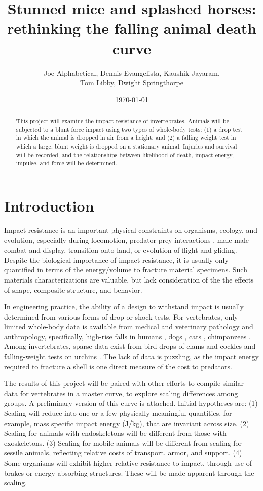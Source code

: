 \documentclass{article}
\title{Stunned mice and splashed horses:  rethinking the falling animal death curve}
\author{Joe Alphabetical, Dennis Evangelista, Kaushik Jayaram,\\ Tom Libby, Dwight Springthorpe}
\date{\today}
\begin{document}
\maketitle

\begin{abstract}
This project will examine the impact resistance of invertebrates.  Animals will be subjected to a blunt force impact using two types of whole-body tests: (1) a drop test in which the animal is dropped in air from a height; and (2) a falling weight test in which a large, blunt weight is dropped on a stationary animal.  Injuries and survival will be recorded, and the relationships between likelihood of death, impact energy, impulse, and force will be determined.
\end{abstract}

\section{Introduction}
Impact resistance is an important physical constraints on organisms, ecology, and evolution, especially during locomotion, predator-prey interactions \citep{Patek:2005}, male-male combat and display, transition onto land, or evolution of flight and gliding.  Despite the biological importance of impact resistance, it is usually only quantified in terms of the energy/volume to fracture material specimens.  Such materials characterizations are valuable, but lack consideration of the the effects of shape, composite structure, and behavior.  

In engineering practice, the ability of a design to withstand impact is usually determined from various forms of drop or shock tests.  For vertebrates, only limited whole-body data is available from medical and veterinary pathology and anthropology, specifically, high-rise falls in humans \citep{Westman:2007, Goren:2004, DeHaven:1942}, dogs \citep{Gordon:1993}, cats \citep{Vnuk:2004}, chimpanzees \citep{Goodall:1986}.  Among invertebrates, sparse data exist from bird drops of clams and cockles \citep{Marron:1982} and falling-weight tests on urchins \citep{Strathmann:1981}.  The lack of data is puzzling, as the impact energy required to fracture a shell is one direct measure of the cost to predators. 

The results of this project will be paired with other efforts to compile similar data for vertebrates in a master curve, to explore scaling differences among groups.  A preliminary version of this curve is attached.  Initial hypotheses are: (1) Scaling will reduce into one or a few physically-meaningful quantities, for example, mass specific impact energy (J/kg), that are invariant across size.  (2) Scaling for animals with endoskeletons will be different from those with exoskeletons.  (3) Scaling for mobile animals will be different from scaling for sessile animals, reflecting relative costs of transport, armor, and support.  (4) Some organisms will exhibit higher relative resistance to impact, through use of brakes or energy absorbing structures.  These will be made apparent through the scaling.
\end{document}
